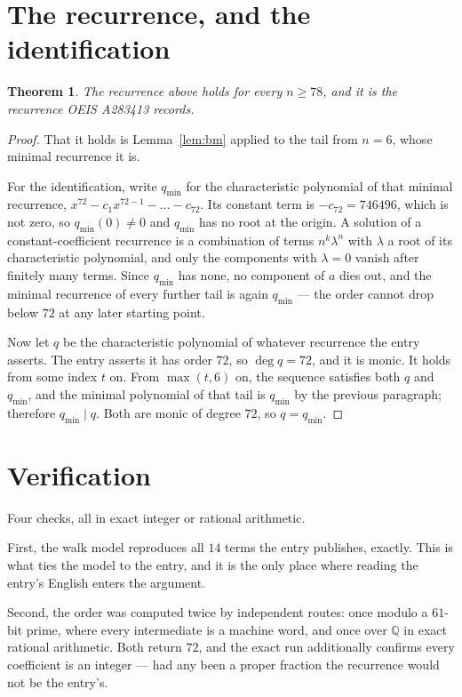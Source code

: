 \documentclass[11pt,a4paper]{article}
\theoremstyle{plain}
\newtheorem{theorem}{Theorem}
\theoremstyle{definition}
\begin{document}
\section{The recurrence, and the identification}

\begin{theorem}
The recurrence above holds for every $n\ge78$, and it is the recurrence OEIS A283413 records.
\end{theorem}

\begin{proof}
That it holds is Lemma~\ref{lem:bm} applied to the tail from $n=6$, whose minimal
recurrence it is.

For the identification, write $q_{\min}$ for the characteristic polynomial of that minimal
recurrence, $x^{72}-c_1x^{72-1}-\dots-c_{72}$. Its constant term is
$-c_{72}=746496$, which is not zero, so $q_{\min}(0)\neq0$ and $q_{\min}$ has no
root at the origin. A solution of a constant-coefficient recurrence is a combination of terms
$n^{k}\lambda^{n}$ with $\lambda$ a root of its characteristic polynomial, and only the
components with $\lambda=0$ vanish after finitely many terms. Since $q_{\min}$ has none, no
component of $a$ dies out, and the minimal recurrence of every further tail is again
$q_{\min}$ --- the order cannot drop below $72$ at any later starting point.

Now let $q$ be the characteristic polynomial of whatever recurrence the entry asserts. The
entry asserts it has order $72$, so $\deg q=72$, and it is monic. It holds from some
index $t$ on. From $\max(t,6)$ on, the sequence satisfies both $q$ and $q_{\min}$, and
the minimal polynomial of that tail is $q_{\min}$ by the previous paragraph; therefore
$q_{\min}\mid q$. Both are monic of degree $72$, so $q=q_{\min}$.
\end{proof}

\section{Verification}

Four checks, all in exact integer or rational arithmetic.

First, the walk model reproduces all $14$ terms the entry publishes, exactly. This is
what ties the model to the entry, and it is the only place where reading the entry's English
enters the argument.

Second, the order was computed twice by independent routes: once modulo a $61$-bit prime, where
every intermediate is a machine word, and once over $\mathbb{Q}$ in exact rational arithmetic.
Both return $72$, and the exact run additionally confirms every coefficient is an integer
--- had any been a proper fraction the recurrence would not be the entry's.
\end{document}
